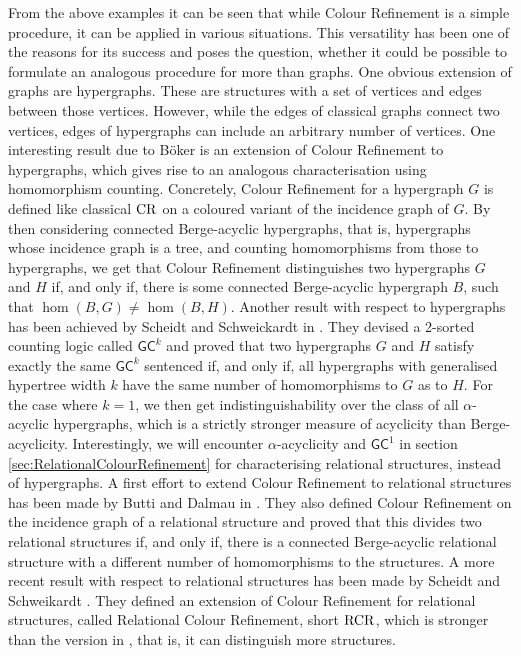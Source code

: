 From the above examples it can be seen that while Colour Refinement is a simple procedure, it can be applied in various situations.
This versatility has been one of the reasons for its success and poses the question, whether it could be possible to formulate an analogous procedure for more than graphs.
One obvious extension of graphs are hypergraphs.
These are structures with a set of vertices and edges between those vertices.
However, while the edges of classical graphs connect two vertices, edges of hypergraphs can include an arbitrary number of vertices.
One interesting result due to Böker \cite{boker2019ColorRefinement} is an extension of Colour Refinement to hypergraphs, which gives rise to an analogous characterisation using homomorphism counting.
Concretely, Colour Refinement for a hypergraph $G$ is defined like classical $\operatorname{CR}$ on a coloured variant of the incidence graph of $G$.
By then considering connected Berge-acyclic hypergraphs, that is, hypergraphs whose incidence graph is a tree, and counting homomorphisms from those to hypergraphs, we get that Colour Refinement distinguishes two hypergraphs $G$ and $H$ if, and only if, there is some connected Berge-acyclic hypergraph $B$, such that $\hom(B, G)\neq \hom(B, H)$.
Another result with respect to hypergraphs has been achieved by Scheidt and Schweickardt in \cite{scheidt2023CountingHomomorphisms}.
They devised a 2-sorted counting logic called $\mathsf{GC}^k$ and proved that two hypergraphs $G$ and $H$ satisfy exactly the same $\mathsf{GC}^k$ sentenced if, and only if, all hypergraphs with generalised hypertree width $k$ have the same number of homomorphisms to $G$ as to $H$.
For the case where $k=1$, we then get indistinguishability over the class of all $\alpha$-acyclic hypergraphs, which is a strictly stronger measure of acyclicity than Berge-acyclicity.
Interestingly, we will encounter $\alpha$-acyclicity and $\mathsf{GC}^1$ in section \ref{sec:RelationalColourRefinement} for characterising relational structures, instead of hypergraphs.
A first effort to extend Colour Refinement to relational structures has been made by Butti and Dalmau in \cite{butti2021FractionalHomomorphism}.
They also defined Colour Refinement on the incidence graph of a relational structure and proved that this divides two relational structures if, and only if, there is a connected Berge-acyclic relational structure with a different number of homomorphisms to the structures.
A more recent result with respect to relational structures has been made by Scheidt and Schweikardt \cite{scheidt2025ColorRefinement}.
They defined an extension of Colour Refinement for relational structures, called Relational Colour Refinement, short $\operatorname{RCR}$, which is stronger than the version in \cite{butti2021FractionalHomomorphism}, that is, it can distinguish more structures.
